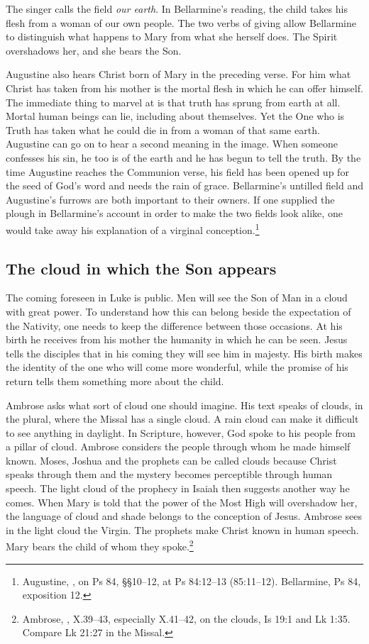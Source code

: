 The singer calls the field \emph{our earth}. In Bellarmine's reading, the child takes his flesh from a woman of our own people. The two verbs of giving allow Bellarmine to distinguish what happens to Mary from what she herself does. The Spirit overshadows her, and she bears the Son.

Augustine also hears Christ born of Mary in the preceding verse. For him what Christ has taken from his mother is the mortal flesh in which he can offer himself. The immediate thing to marvel at is that truth has sprung from earth at all. Mortal human beings can lie, including about themselves. Yet the One who is Truth has taken what he could die in from a woman of that same earth. Augustine can go on to hear a second meaning in the image. When someone confesses his sin, he too is of the earth and he has begun to tell the truth. By the time Augustine reaches the Communion verse, his field has been opened up for the seed of God's word and needs the rain of grace. Bellarmine's untilled field and Augustine's furrows are both important to their owners. If one supplied the plough in Bellarmine's account in order to make the two fields look alike, one would take away his explanation of a virginal conception.\footnote{Augustine, , on Ps 84, §§10--12, at Ps 84:12--13 (85:11--12). Bellarmine, Ps 84, exposition 12.}

\subsection{The cloud in which the Son appears}

The coming foreseen in Luke is public. Men will see the Son of Man in a cloud with great power. To understand how this can belong beside the expectation of the Nativity, one needs to keep the difference between those occasions. At his birth he receives from his mother the humanity in which he can be seen. Jesus tells the disciples that in his coming they will see him in majesty. His birth makes the identity of the one who will come more wonderful, while the promise of his return tells them something more about the child.

Ambrose asks what sort of cloud one should imagine. His text speaks of clouds, in the plural, where the Missal has a single cloud. A rain cloud can make it difficult to see anything in daylight. In Scripture, however, God spoke to his people from a pillar of cloud. Ambrose considers the people through whom he made himself known. Moses, Joshua and the prophets can be called clouds because Christ speaks through them and the mystery becomes perceptible through human speech. The light cloud of the prophecy in Isaiah then suggests another way he comes. When Mary is told that the power of the Most High will overshadow her, the language of cloud and shade belongs to the conception of Jesus. Ambrose sees in the light cloud the Virgin. The prophets make Christ known in human speech. Mary bears the child of whom they spoke.\footnote{Ambrose, , X.39--43, especially X.41--42, on the clouds, Is 19:1 and Lk 1:35. Compare Lk 21:27 in the Missal.}

